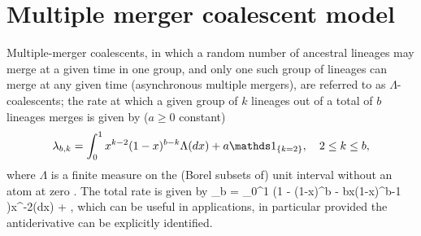 \documentclass{article}
\begin{document}
\label{app-multiple-mergers}
\section*{Multiple merger coalescent model}

Multiple-merger coalescents, in which a random number of ancestral
lineages may merge at a given time in one group, and only one such
group of lineages can merge at any given time (asynchronous multiple
mergers), are referred to as $\Lambda$-coalescents; the rate at which  a given group of $k$ lineages out of a total of  $b$ lineages merges  is given by ($a\ge  0$ constant)
\begin{equation}\label{lambdabk}
\lambda_{b, k} =  \int_0^1  x^{k-2}(1-x)^{b-k}\Lambda(dx) + a\one{k=2}, \quad 2 \le k \le b,
\end{equation}
where $\Lambda$ is a finite measure on the  (Borel subsets of)  unit interval without an atom at zero \citep{DK99,P99,S99}.    The  total rate  is given by
\be\label{lambdab}
 \lambda_{b} = \int_0^1 \left(1 - (1-x)^{b} - bx(1-x)^{b-1} \right)x^{-2}\Lambda(dx) + ,
\ee
\citep{S99}  which can be useful in applications, in particular  provided the  antiderivative  can be explicitly identified.
\end{document}
